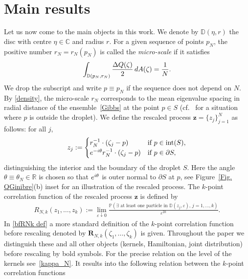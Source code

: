 \documentclass[11pt]{article}
\numberwithin{equation}{section}
\numberwithin{equation}{section}
\newcommand{\bfR}{\mathbf{R}}
\newcommand{\R}{{\mathbb R}}
\newcommand{\C}{{\mathbb C}}
\newcommand{\eps}{{\varepsilon}}
\newcommand{\1}{\chi}
\begin{document}
\section{Main results}\label{sec:main}
Let us now come to the main objects in this work. We denote by $\mathbb{D}(\eta,r)$ the disc with centre $\eta \in \C$ and radius $r$. For a given sequence of points $p_N$, the positive number $r_N=r_N(p_N)$ is called the \textit{micro-scale} if it satisfies
\begin{gather} \label{micro-scale}
	\int_{ \mathbb{D}(p_N,r_N) } \frac{ \Delta Q(\zeta) }{2} \,{\rm d}A(\zeta)= \frac{1}{N}.
\end{gather}
We drop the subscript and write $p \equiv p_N$ if the sequence does not depend on $N$.
By \eqref{density}, the micro-scale $r_N$ corresponds to the mean eigenvalue spacing in radial distance of the ensemble~\eqref{Gibbs} at the point $p\in S$
(cf.~\cite{BE} for a situation where $p$ is outside the droplet).
We define the rescaled process $\boldsymbol{z}=\{ z_j \}_{ j=1 }^N$ as follows: for all $j$,
\begin{gather} \label{rescaling}
	z_j:=
	\begin{cases}
		r_N^{-1} \cdot (\zeta_j-p) &\text{if } p \in \operatorname{int}(S) ,
		\\
		{\rm e}^{-{\rm i}\theta} r_N^{-1} \cdot (\zeta_j-p) &\text{if } p \in \partial S ,
	\end{cases}
\end{gather}
distinguishing the interior and the boundary of the droplet $S$.
Here the angle $\theta\equiv \theta_N \in \R$ is chosen so that ${\rm e}^{{\rm i}\theta}$ is outer normal to $\partial S$ at $p$, see Figure~\ref{Fig. QGinibre}(b)
inset
for an illustration of the rescaled process.
The $k$-point correlation function of
the rescaled process $\boldsymbol{z}$ is defined by
\begin{gather*}
R_{N,k}(z_1,\dots,z_k)
:= \lim_{\eps \downarrow 0} \frac{\mathbb{P}(\exists \text{ at least one particle in } \mathbb{D}(z_j,\eps),\, j=1,\dots,k ) }{\eps^{2k}}.
\end{gather*}
In \eqref{bfRNk def} a more standard definition of the $k$-point correlation function before rescaling denoted by $\bfR_{N,k}(\zeta_1,\dots,\zeta_k)$ is given.
Throughout the paper we distinguish these and all other objects (kernels, Hamiltonian, joint distribution) before rescaling by bold symbols.
For the precise relation on the level of the kernels see~\eqref{kappa_N}. It results into the following relation between the $k$-point correlation functions
\end{document}
